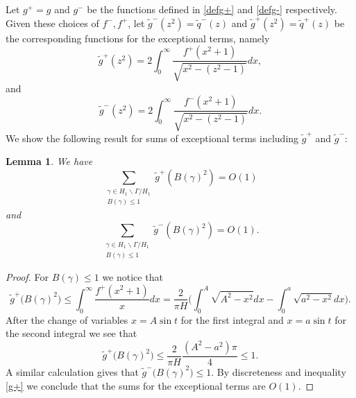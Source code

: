 \documentclass[a4paper,11pt]{amsart}
\newtheorem{lem}[theorem]{Lemma}
\theoremstyle{definition}
\begin{document}
Let $g^{+}=g$ and $g^{-}$  be the functions defined in \eqref{defg+} and \eqref{defg-} respectively. Given these choices of $f^{-},f^{+}$, let $\widetilde{g}^{-}(z^2)=\widetilde{q}^{-}(z)$ and $\widetilde{g}^{+}(z^2)=\widetilde{q}^{+}(z)$ be the corresponding functions for the exceptional terms, namely
$$\widetilde{g}^{+}(z^2)=2\int_0^{\infty}\frac{f^{+}(x^2+1)}{\sqrt{x^2-(z^2-1)}}dx,$$ and
$$\widetilde{g}^{-}(z^2)=2\int_0^{\infty}\frac{f^{-}(x^2+1)}{\sqrt{x^2-(z^2-1)}}dx.$$
We show the following result for sums of exceptional terms including $\widetilde{g}^{+}$ and $\widetilde{g}^{-}$:
\begin{lem}\label{Exc}
We have 
\begin{equation}
\sum_{\substack{{\gamma \in H_1 \backslash \Gamma /H_1} \\ B(\gamma) \leq 1 }}\widetilde{g}^{+}(B(\gamma)^2)=O(1)
\end{equation}
and 
\begin{equation}
\sum_{\substack{{\gamma \in H_1 \backslash \Gamma /H_1} \\ B(\gamma) \leq 1 }}\widetilde{g}^{-}(B(\gamma)^2)=O(1).
\end{equation}
\end{lem}
\begin{proof}
For $B(\gamma)\le 1$ we notice that 
$$ \widetilde{g}^{+}\big(B(\gamma)^2\big)\le \int_0^{\infty}\frac{f^{+}(x^2+1)}{x}dx = \frac{2}{\pi H}\Bigg(\int_0^{A}\sqrt{A^2-x^2}dx-\int_0^a\sqrt{a^2-x^2}dx\Bigg).$$
After the change of variables $x=A\sin t$ for the first integral and $x=a\sin t$ for the second integral we see that
\begin{equation}\label{g+}
    \widetilde{g}^{+}\big(B(\gamma)^2\big)\le \frac{2}{\pi H}\frac{(A^2-a^2)\pi}{4} \le 1.
\end{equation}
A similar calculation gives that $\widetilde{g}^{-}\big(B(\gamma)^2\big) \le 1$.
By discreteness and inequality \eqref{g+} we conclude that the sums for the exceptional terms are $O(1)$.
\end{proof}
\end{document}
